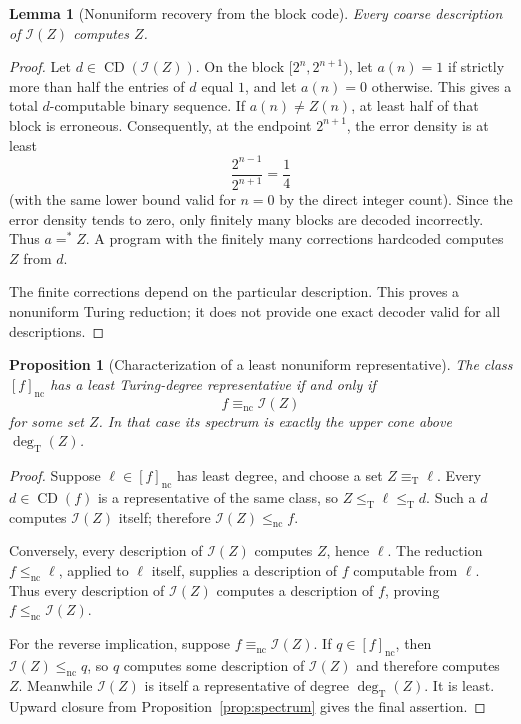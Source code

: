 \documentclass[11pt,a4paper]{article}
\newcommand{\leT}{\leq_{\mathrm T}}
\newcommand{\eqT}{\equiv_{\mathrm T}}
\newcommand{\degT}{\operatorname{deg}_{\mathrm T}}
\newcommand{\CD}{\operatorname{CD}}
\newcommand{\nc}{\mathrm{nc}}
\newcommand{\Icode}{\mathcal I}
\newtheorem{lemma}[theorem]{Lemma}
\newtheorem{proposition}[theorem]{Proposition}
\theoremstyle{definition}
\theoremstyle{remark}
\begin{document}
\begin{lemma}[Nonuniform recovery from the block code]\label{lem:block}
Every coarse description of $\Icode(Z)$ computes $Z$.
\end{lemma}
\begin{proof}
Let $d\in\CD(\Icode(Z))$. On the block $[2^n,2^{n+1})$, let $a(n)=1$ if strictly more than half the entries of $d$ equal $1$, and let $a(n)=0$ otherwise. This gives a total $d$-computable binary sequence. If $a(n)\ne Z(n)$, at least half of that block is erroneous. Consequently, at the endpoint $2^{n+1}$, the error density is at least
\[
\frac{2^{n-1}}{2^{n+1}}=\frac14
\]
(with the same lower bound valid for $n=0$ by the direct integer count). Since the error density tends to zero, only finitely many blocks are decoded incorrectly. Thus $a=^*Z$. A program with the finitely many corrections hardcoded computes $Z$ from $d$.

The finite corrections depend on the particular description. This proves a nonuniform Turing reduction; it does not provide one exact decoder valid for all descriptions.
\end{proof}

\begin{proposition}[Characterization of a least nonuniform representative]\label{prop:least-code}
The class $[f]_{\nc}$ has a least Turing-degree representative if and only if
\[
f\equiv_{\nc}\Icode(Z)
\]
for some set $Z$. In that case its spectrum is exactly the upper cone above $\degT(Z)$.
\end{proposition}
\begin{proof}
Suppose $\ell\in[f]_{\nc}$ has least degree, and choose a set $Z\eqT\ell$. Every $d\in\CD(f)$ is a representative of the same class, so $Z\leT\ell\leT d$. Such a $d$ computes $\Icode(Z)$ itself; therefore $\Icode(Z)\leq_{\nc}f$.

Conversely, every description of $\Icode(Z)$ computes $Z$, hence $\ell$. The reduction $f\leq_{\nc}\ell$, applied to $\ell$ itself, supplies a description of $f$ computable from $\ell$. Thus every description of $\Icode(Z)$ computes a description of $f$, proving $f\leq_{\nc}\Icode(Z)$.

For the reverse implication, suppose $f\equiv_{\nc}\Icode(Z)$. If $q\in[f]_{\nc}$, then $\Icode(Z)\leq_{\nc}q$, so $q$ computes some description of $\Icode(Z)$ and therefore computes $Z$. Meanwhile $\Icode(Z)$ is itself a representative of degree $\degT(Z)$. It is least. Upward closure from Proposition~\ref{prop:spectrum} gives the final assertion.
\end{proof}
\end{document}
